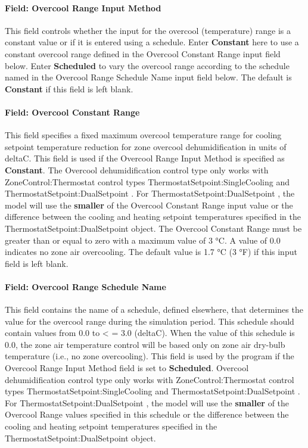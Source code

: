 \paragraph{Field: Overcool Range Input Method}\label{field-overcool-range-input-method}

This field controls whether the input for the overcool (temperature) range is a constant value or if it is entered using a schedule. Enter \textbf{Constant} here to use a constant overcool range defined in the Overcool Constant Range input field below. Enter \textbf{Scheduled} to vary the overcool range according to the schedule named in the Overcool Range Schedule Name input field below. The default is \textbf{Constant} if this field is left blank.

\paragraph{Field: Overcool Constant Range}\label{field-overcool-constant-range}

This field specifies a fixed maximum overcool temperature range for cooling setpoint temperature reduction for zone overcool dehumidification in units of deltaC. This field is used if the Overcool Range Input Method is specified as \textbf{Constant}. The Overcool dehumidification control type only works with ZoneControl:Thermostat control types ThermostatSetpoint:SingleCooling and ThermostatSetpoint:DualSetpoint . For ThermostatSetpoint:DualSetpoint , the model will use the \textbf{smaller} of the Overcool Constant Range input value or the difference between the cooling and heating setpoint temperatures specified in the ThermostatSetpoint:DualSetpoint object. The Overcool Constant Range must be greater than or equal to zero with a maximum value of 3 °C. A value of 0.0 indicates no zone air overcooling. The default value is 1.7 °C (3 °F) if this input field is left blank.

\paragraph{Field: Overcool Range Schedule Name}\label{field-overcool-range-schedule-name}

This field contains the name of a schedule, defined elsewhere, that determines the value for the overcool range during the simulation period. This schedule should contain values from 0.0 to \textless{} = 3.0 (deltaC). When the value of this schedule is 0.0, the zone air temperature control will be based only on zone air dry-bulb temperature (i.e., no zone overcooling). This field is used by the program if the Overcool Range Input Method field is set to \textbf{Scheduled}. Overcool dehumidification control type only works with ZoneControl:Thermostat control types ThermostatSetpoint:SingleCooling and ThermostatSetpoint:DualSetpoint . For ThermostatSetpoint:DualSetpoint , the model will use the \textbf{smaller} of the Overcool Range values specified in this schedule or the difference between the cooling and heating setpoint temperatures specified in the ThermostatSetpoint:DualSetpoint object.

